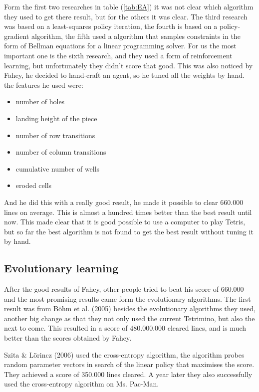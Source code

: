 \documentclass{report}
\begin{document}
Form the first two researches in table (\ref{tab:EA}) it was not clear which algorithm they used to get there result, but for the others it was clear. The third research was based on a least-squares policy iteration, the fourth is based on a policy-gradient algorithm, the fifth used a algorithm that samples constraints in the form of Bellman equations for a linear programming solver. For us the most important one is the sixth research, and they used a form of reinforcement learning, but unfortunately they didn't score that good. This was also noticed by Fahey, he decided to hand-craft an agent, so he tuned all the weights by hand. the features he used were:
\begin{itemize}
    \item number of holes
    \item landing height of the piece
    \item number of row transitions
    \item number of column transitions
    \item cumulative number of wells
    \item eroded cells
\end{itemize}

And he did this with a really good result, he made it possible to clear 660.000 lines on average. This is almost a hundred times better than the best result until now. This made clear that it is good possible to use a computer to play Tetris, but so far the best algorithm is not found to get the best result without tuning it by hand.

\subsection{Evolutionary learning}
After the good results of Fahey, other people tried to beat his score of 660.000 and the most promising results came form the evolutionary algorithms. The first result was from B\"ohm et al. (2005) besides the evolutionary algorithms they used, another big change as that they not only used the current Tetrimino, but also the next to come. This resulted in a score of 480.000.000 cleared lines, and is much better than the scores obtained by Fahey.

Szita \& L\"orincz (2006) used the cross-entropy algorithm, the algorithm probes random parameter vectors in search of the linear policy that maximises the score. They achieved a score of 350.000 lines cleared. A year later they also successfully used the cross-entropy algorithm on Ms. Pac-Man.
\end{document}
